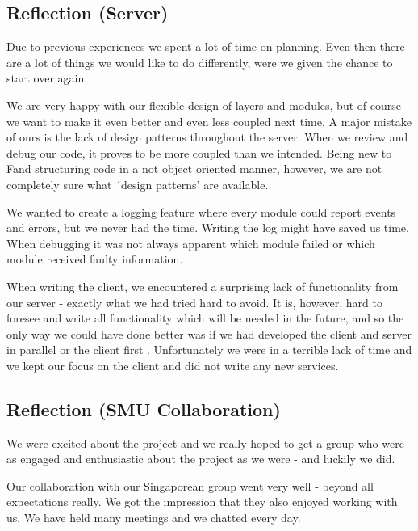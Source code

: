 \subsection{Reflection (Server)}
Due to previous experiences we spent a lot of time on planning. Even then there are a lot of things we would like to do differently, were we given the chance to start over again.

We are very happy with our flexible design of layers and modules, but of course we want to make it even better and even less coupled next time. A major mistake of ours is the lack of design patterns throughout the server. When we review and debug our code, it proves to be more coupled than we intended. Being new to F\Sh and structuring code in a not object oriented manner, however, we are not completely sure what ´design patterns' are available.

We wanted to create a logging feature where every module could report events and errors, but we never had the time. Writing the log might have saved us time. When debugging it was not always apparent which module failed or which module received faulty information. 

When writing the client, we encountered a surprising lack of functionality from our server - exactly what we had tried hard to avoid. It is, however, hard to foresee and write all functionality which will be needed in the future, and so the only way we could have done better was if we had developed the client and server in parallel or the client first .
Unfortunately we were in a terrible lack of time and we kept our focus on the client and did not write any new services.

\subsection{Reflection (SMU Collaboration)}
We were excited about the project and we really hoped to get a group who were as engaged and enthusiastic about the project as we were - and luckily we did.

Our collaboration with our Singaporean group went very well - beyond all expectations really. We got the impression that they also enjoyed working with us. We have held many meetings and we chatted every day.

\newpage